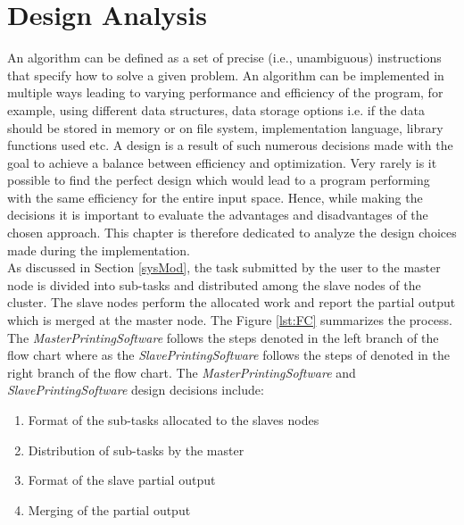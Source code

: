 \chapter{Design Analysis}
An algorithm can be defined as a set of precise (i.e., unambiguous) instructions that specify how to solve a given problem. An algorithm can be implemented in multiple ways leading to varying performance and efficiency of the program, for example, using different data structures, data storage options i.e. if the data should be stored in memory or on file system, implementation language, library functions used etc. A design is a result of such numerous decisions made with the goal to achieve a balance between efficiency and optimization. Very rarely is it possible to find the perfect design which would lead to a program performing with the same efficiency for the entire input space. Hence, while making the decisions it is important to evaluate the advantages and disadvantages of the chosen approach. This chapter is therefore dedicated to analyze the design choices made during the implementation. \\

As discussed in Section \ref{sysMod}, the task submitted by the user to the master node is divided into sub-tasks and distributed among the slave nodes of the cluster. The slave nodes perform the allocated work and report the partial output which is merged at the master node. The Figure \ref{lst:FC} summarizes the process. The \textit{MasterPrintingSoftware} follows the steps denoted in the left branch of the flow chart where as the \textit{SlavePrintingSoftware} follows the steps of denoted in the right branch of the flow chart. The \textit{MasterPrintingSoftware} and \textit{SlavePrintingSoftware} design decisions include:
\begin{enumerate}
\item Format of the sub-tasks allocated to the slaves nodes
\item Distribution of sub-tasks by the master
\item Format of the slave partial output 
\item Merging of the partial output 
\end{enumerate}

